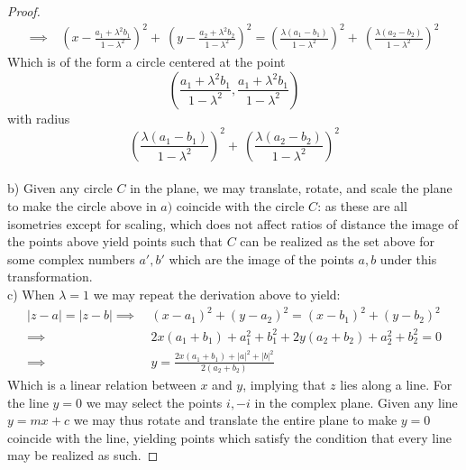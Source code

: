\documentclass{article}
\begin{document}
\begin{proof}
\begin{align*}
  \implies \ & \left(x - \frac{a_{1} + \lambda^{2}b_{1}}{1-\lambda^{2}}\right) ^{2} + \ \left(y - \frac{a_{2} + \lambda^{2}b_{2}}{1-\lambda^{2}}\right) ^{2} =  \left(\frac{\lambda(a_{1} - b_{1})}{1-\lambda^{2}}\right)^{2} + \ \left(\frac{\lambda(a_{2} - b_{2})}{1-\lambda^{2}}\right)^{2}  
\end{align*}
Which is of the form a circle centered at the point \[\left(\frac{a_{1}+\lambda^{2}b_{1}}{1-\lambda^{2}}, \frac{a_{1}+\lambda^{2}b_{1}}{1-\lambda^{2}}\right)\] with radius \[ \left(\frac{\lambda(a_{1} - b_{1})}{1-\lambda^{2}}\right)^{2} + \ \left(\frac{\lambda(a_{2} - b_{2})}{1-\lambda^{2}}\right)^{2} \] 
\\ 
b) Given any circle $C$ in the plane, we may translate, rotate, and scale the plane to make the circle above in $a)$ coincide with the circle $C$: as these are all isometries except for scaling, which does not affect ratios of distance the image of the points above yield points such that $C$ can be realized as the set above for some complex numbers $a',b'$ which are the image of the points $a,b$ under this transformation.
\\
c) When $\lambda = 1$ we may repeat the derivation above to yield: 
\begin{align*}
  |z-a| = |z-b| \implies \ &(x-a_{1})^{2} + (y -a_{2})^{2} = (x-b_{1})^{2} + (y-b_{2})^{2} \\
  \implies \ &2x(a_{1}+b_{1}) + a_{1}^{2}+b_{1}^{2} + 2y(a_{2}+b_{2}) +a_{2}^{2}+b_{2}^{2} = 0 \\
  \implies \ & y = \frac{2x(a_{1}+b_{1}) + |a|^{2} + |b|^{2}}{2(a_{2}+b_{2})}
\end{align*}
Which is a linear relation between $x$ and $y$, implying that $z$ lies along a line. For the line $y = 0$ we may select the points $i, -i$ in the complex plane. Given any line $y = mx+c$ we may thus rotate and translate the entire plane to make $y = 0$ coincide with the line, yielding points which satisfy the condition that every line may be realized as such. 
\end{proof}
\end{document}
